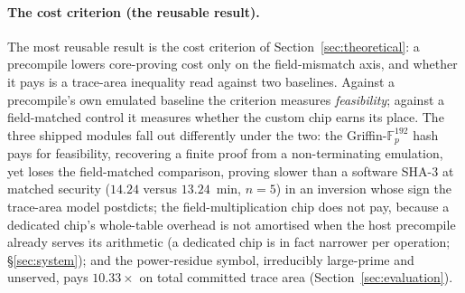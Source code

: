 \paragraph{The cost criterion (the reusable result).}
The most reusable result is the cost criterion of Section~\ref{sec:theoretical}: a precompile lowers core-proving cost only on the field-mismatch axis, and whether it pays is a trace-area inequality read against two baselines. Against a precompile's own emulated baseline the criterion measures \emph{feasibility}; against a field-matched control it measures whether the custom chip earns its place. The three shipped modules fall out differently under the two: the Griffin-$\mathbb{F}_p^{192}$ hash pays for feasibility, recovering a finite proof from a non-terminating emulation, yet loses the field-matched comparison, proving slower than a software SHA-3 at matched security ($14.24$ versus $13.24$~min, $n=5$) in an inversion whose sign the trace-area model postdicts; the field-multiplication chip does not pay, because a dedicated chip's whole-table overhead is not amortised when the host precompile already serves its arithmetic (a dedicated chip is in fact narrower per operation; \S\ref{sec:system}); and the power-residue symbol, irreducibly large-prime and unserved, pays $10.33\times$ on total committed trace area (Section~\ref{sec:evaluation}).

